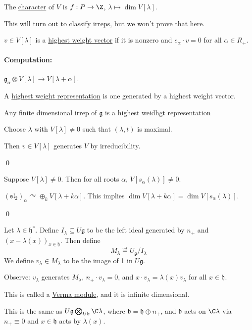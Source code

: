\documentclass[x11names,reqno,14pt]{extarticle}
\newcommand{\mk}[1]{\mathfrak{#1}}
\newcommand{\g}{\mk{g}}
\newcommand{\h}{\mk{h}}
\renewcommand{\sl}{\mk{s}\mk{l}}
\begin{document}

The \underline{character} of $V$ is $f:P\to\Z$, $\lambda\mapsto \dim V[\lambda]$.

This will turn out to classify irreps, but we won't prove that here. 


$v \in V[\lambda]$ is a \underline{highest weight vector} if it is nonzero and $e_\alpha\cdot v = 0$ for all $\alpha \in R_+$. 

\paragraph{Computation:} $\g_\alpha\otimes V[\lambda] \to V[\lambda+\alpha]$. 


A \underline{highest weight representation} is one generated by a highest weight vector. 

\prop

Any finite dimensional irrep of $\g$ is a highest weidhgt representation

\proof

Choose $\lambda$ with $V[\lambda]\neq0$ such that $(\lambda,t)$ is maximal. 

Then $v \in V[\lambda]$ generates $V$ by irreducibility. 

\qed

\prop

Suppose $V[\lambda]\neq0$. Then for all roots $\alpha$, $V[s_\alpha(\lambda)]\neq0$. 

\proof

$(\sl_2)_\alpha\curvearrowright \oplus_kV[\lambda+k\alpha]$. This implies $\dim V[\lambda+k\alpha] = \dim V[s_\alpha(\lambda)]$. 

\qed


Let $\lambda \in \h^*$. Define $I_\lambda \subseteq U\g$ to be the left ideal generated by $n_+$ and $(x-\lambda(x))_{x\in\h}$. Then define
\[
M_\lambda \eqdef U_\g / I_\lambda
\]
We define $v_\lambda \in M_\lambda$ to be the image of 1 in $U\g$.

Observe: $v_\lambda$ generates $M_\lambda$, $n_+\cdot v_\lambda = 0$, and $x\cdot v_\lambda = \lambda(x)v_\lambda$ for all $x \in \h$. 

This is called a \underline{Verma module}, and it is infinite dimensional. 

This is the same as $U\g\bigotimes_{U\mk{b}}\C\lambda$, where $\mk{b} = \h\oplus n_+$, and $\mk{b}$ acts on $\C\lambda$ via $n_+ \equiv 0$ and $x \in \h$ acts by $\lambda(x)$. 
\end{document}
